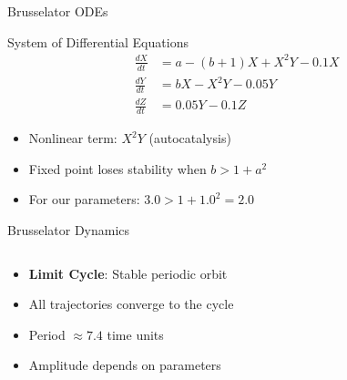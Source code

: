 \documentclass{beamer}
\begin{document}
\begin{frame}{Brusselator ODEs}
\begin{block}{System of Differential Equations}
\begin{align}
\frac{dX}{dt} &= a - (b+1)X + X^2Y - 0.1X \\
\frac{dY}{dt} &= bX - X^2Y - 0.05Y \\
\frac{dZ}{dt} &= 0.05Y - 0.1Z
\end{align}
\end{block}

\begin{itemize}
    \item Nonlinear term: $X^2Y$ (autocatalysis)
    \item Fixed point loses stability when $b > 1 + a^2$
    \item For our parameters: $3.0 > 1 + 1.0^2 = 2.0$
\end{itemize}
\end{frame}

\begin{frame}{Brusselator Dynamics}
\begin{columns}
\begin{column}{0.5\textwidth}
\begin{itemize}
    \item \textbf{Limit Cycle}: Stable periodic orbit
    \item All trajectories converge to the cycle
    \item Period $\approx 7.4$ time units
    \item Amplitude depends on parameters
\end{itemize}
\end{column}
\begin{column}{0.5\textwidth}
\end{column}
\end{columns}
\end{frame}
\end{document}
